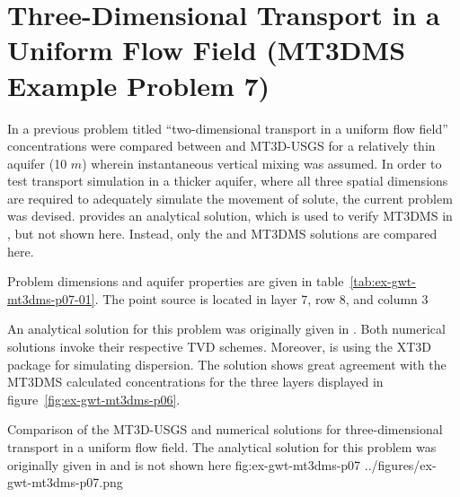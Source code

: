 \section{Three-Dimensional Transport in a Uniform Flow Field (MT3DMS Example Problem 7)}

In a previous problem titled ``two-dimensional transport in a uniform flow field'' concentrations were compared between \mf and MT3D-USGS for a relatively thin aquifer (10 $m$) wherein instantaneous vertical mixing was assumed.  In order to test transport simulation in a thicker aquifer, where all three spatial dimensions are required to adequately simulate the movement of solute, the current problem was devised. \cite{hunt1978} provides an analytical solution, which is used to verify MT3DMS in \cite{zheng1999mt3dms}, but not shown here.  Instead, only the \mf and MT3DMS solutions are compared here. 

Problem dimensions and aquifer properties are given in table~\ref{tab:ex-gwt-mt3dms-p07-01}.  The point source is located in layer 7, row 8, and column 3



An analytical solution for this problem was originally given in \cite{hunt1978}.  Both numerical solutions invoke their respective TVD schemes.  Moreover, \mf is using the XT3D package for simulating dispersion.  The \mf solution shows great agreement with the MT3DMS calculated concentrations for the three layers displayed in figure~\ref{fig:ex-gwt-mt3dms-p06}. 

\begin{StandardFigure}
	{Comparison of the MT3D-USGS and \mf numerical solutions for three-dimensional transport in a uniform flow field. The analytical solution for this problem was originally given in \citep{hunt1978} and is not shown here} 
	{fig:ex-gwt-mt3dms-p07}
	{../figures/ex-gwt-mt3dms-p07.png}
\end{StandardFigure}


